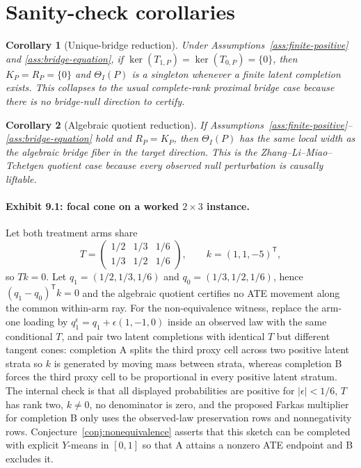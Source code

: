 \documentclass[11pt]{article}
\newcommand{\transpose}{\mathsf{T}}
\theoremstyle{definition}
\theoremstyle{plain}
\newtheorem{corollary}{Corollary}
\theoremstyle{remark}
\begin{document}
\section{Sanity-check corollaries}
\begin{corollary}[Unique-bridge reduction]\label{cor:unique}
Under Assumptions~\ref{ass:finite-positive} and \ref{ass:bridge-equation}, if \(\ker(T_{1,P})=\ker(T_{0,P})=\{0\}\), then \(K_P=R_P=\{0\}\) and \(\Theta_I(P)\) is a singleton whenever a finite latent completion exists. This collapses to the usual complete-rank proximal bridge case because there is no bridge-null direction to certify.
\end{corollary}

\begin{corollary}[Algebraic quotient reduction]\label{cor:quotient}
If Assumptions~\ref{ass:finite-positive}--\ref{ass:bridge-equation} hold and \(R_P=K_P\), then \(\Theta_I(P)\) has the same local width as the algebraic bridge fiber in the target direction. This is the Zhang--Li--Miao--Tchetgen quotient case because every observed null perturbation is causally liftable.
\end{corollary}

\paragraph{Exhibit 9.1: focal cone on a worked \(2\times3\) instance.}
Let both treatment arms share
\[
T=\begin{pmatrix}1/2&1/3&1/6\\1/3&1/2&1/6\end{pmatrix},
\qquad k=(1,1,-5)^{\transpose},
\]
so \(Tk=0\). Let \(q_1=(1/2,1/3,1/6)\) and \(q_0=(1/3,1/2,1/6)\), hence \((q_1-q_0)^{\transpose}k=0\) and the algebraic quotient certifies no ATE movement along the common within-arm ray. For the non-equivalence witness, replace the arm-one loading by \(q_1^\epsilon=q_1+\epsilon(1,-1,0)\) inside an observed law with the same conditional \(T\), and pair two latent completions with identical \(T\) but different tangent cones: completion A splits the third proxy cell across two positive latent strata so \(k\) is generated by moving mass between strata, whereas completion B forces the third proxy cell to be proportional in every positive latent stratum. The internal check is that all displayed probabilities are positive for \(|\epsilon|<1/6\), \(T\) has rank two, \(k\ne0\), no denominator is zero, and the proposed Farkas multiplier for completion B only uses the observed-law preservation rows and nonnegativity rows. Conjecture~\ref{conj:nonequivalence} asserts that this sketch can be completed with explicit \(Y\)-means in \([0,1]\) so that A attains a nonzero ATE endpoint and B excludes it.
\end{document}
